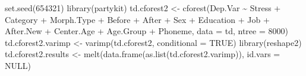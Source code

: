 \documentclass[
  10pt,
  letterpaper]{article}
\newenvironment{Shaded}{\begin{snugshade}}{\end{snugshade}}
\newcommand{\AttributeTok}[1]{\textcolor[rgb]{0.40,0.45,0.13}{#1}}
\newcommand{\ConstantTok}[1]{\textcolor[rgb]{0.56,0.35,0.01}{#1}}
\newcommand{\DecValTok}[1]{\textcolor[rgb]{0.68,0.00,0.00}{#1}}
\newcommand{\FloatTok}[1]{\textcolor[rgb]{0.68,0.00,0.00}{#1}}
\newcommand{\FunctionTok}[1]{\textcolor[rgb]{0.28,0.35,0.67}{#1}}
\newcommand{\NormalTok}[1]{\textcolor[rgb]{0.00,0.23,0.31}{#1}}
\newcommand{\OtherTok}[1]{\textcolor[rgb]{0.00,0.23,0.31}{#1}}
\newcommand{\SpecialCharTok}[1]{\textcolor[rgb]{0.37,0.37,0.37}{#1}}
\newcommand{\StringTok}[1]{\textcolor[rgb]{0.13,0.47,0.30}{#1}}
\begin{document}
\begin{Shaded}
\begin{Highlighting}[]
\FunctionTok{set.seed}\NormalTok{(}\DecValTok{654321}\NormalTok{)}
\FunctionTok{library}\NormalTok{(partykit)}
\NormalTok{td.cforest2 }\OtherTok{\textless{}{-}} \FunctionTok{cforest}\NormalTok{(Dep.Var }\SpecialCharTok{\textasciitilde{}}\NormalTok{ Stress }\SpecialCharTok{+}\NormalTok{ Category }\SpecialCharTok{+}
\NormalTok{    Morph.Type }\SpecialCharTok{+}\NormalTok{ Before }\SpecialCharTok{+}\NormalTok{ After }\SpecialCharTok{+}\NormalTok{ Sex }\SpecialCharTok{+}\NormalTok{ Education }\SpecialCharTok{+}
\NormalTok{    Job }\SpecialCharTok{+}\NormalTok{ After.New }\SpecialCharTok{+}\NormalTok{ Center.Age }\SpecialCharTok{+}\NormalTok{ Age.Group }\SpecialCharTok{+}\NormalTok{ Phoneme,}
    \AttributeTok{data =}\NormalTok{ td, }\AttributeTok{ntree =} \DecValTok{8000}\NormalTok{)}
\NormalTok{td.cforest2.varimp }\OtherTok{\textless{}{-}} \FunctionTok{varimp}\NormalTok{(td.cforest2, }\AttributeTok{conditional =} \ConstantTok{TRUE}\NormalTok{)}
\FunctionTok{library}\NormalTok{(reshape2)}
\NormalTok{td.cforest2.results }\OtherTok{\textless{}{-}} \FunctionTok{melt}\NormalTok{(}\FunctionTok{data.frame}\NormalTok{(}\FunctionTok{as.list}\NormalTok{(td.cforest2.varimp)),}
    \AttributeTok{id.vars =} \ConstantTok{NULL}\NormalTok{)}
\end{Highlighting}
\end{Shaded}

\begin{Shaded}
\end{Shaded}
\end{document}

